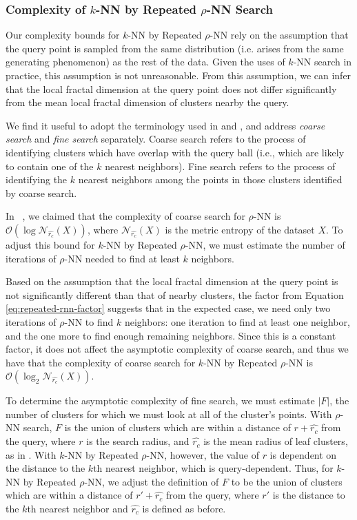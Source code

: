 \subsubsection{Complexity of \texorpdfstring{$k$}{k}-NN by Repeated \texorpdfstring{$\rho$}{p}-NN Search}
\label{subsubsec:methods:repeated-rnn-complexity}

Our complexity bounds for $k$-NN by Repeated $\rho$-NN rely on the assumption that the query point is sampled from the same distribution (i.e. arises from the same generating phenomenon) as the rest of the data.
Given the uses of $k$-NN search in practice, this assumption is not unreasonable.
From this assumption, we can infer that the local fractal dimension at the query point does not differ significantly from the mean local fractal dimension of clusters nearby the query.

We find it useful to adopt the terminology used in \cite{ishaq2019clustered} and \cite{yu2015entropy}, and address \emph{coarse search} and \emph{fine search} separately.
Coarse search refers to the process of identifying clusters which have overlap with the query ball (i.e., which are likely to contain one of the $k$ nearest neighbors). 
Fine search refers to the process of identifying the $k$ nearest neighbors among the points in those clusters identified by coarse search.

In ~\cite{ishaq2019clustered}, we claimed that the complexity of coarse search for $\rho$-NN is $\mathcal{O}(\log\mathcal{N}_{\hat{r_c}}(X))$, 
where $\mathcal{N}_{\hat{r_c}}(X)$ is the metric entropy of the dataset $X$. 
To adjust this bound for $k$-NN by Repeated $\rho$-NN, we must estimate the number of iterations of $\rho$-NN needed to find at least $k$ neighbors.

Based on the assumption that the local fractal dimension at the query point is not significantly different than that of nearby clusters, the factor from Equation \ref{eq:repeated-rnn-factor} suggests that in the expected case, we need only two iterations of $\rho$-NN to find $k$ neighbors:
one iteration to find at least one neighbor, and the one more to find enough remaining neighbors.
Since this is a constant factor, it does not affect the asymptotic complexity of coarse search, and thus we have that the complexity of coarse search for $k$-NN by Repeated $\rho$-NN is $\mathcal{O}(\log_2\mathcal{N}_{\hat{r_c}}(X))$.

To determine the asymptotic complexity of fine search, we must estimate $|F|$, the number of clusters for which we must look at all of the cluster's points.
With $\rho$-NN search, $F$ is the union of clusters which are within a distance of $r + \hat{r_c}$ from the query, where $r$ is the search radius, and $\hat{r_c}$ is the mean radius of leaf clusters, as in \cite{yu2015entropy}.
With $k$-NN by Repeated $\rho$-NN, however, the value of $r$ is dependent on the distance to the $k$th nearest neighbor, which is query-dependent.
Thus, for $k$-NN by Repeated $\rho$-NN, we adjust the definition of $F$ to be the union of clusters which are within a distance of $r' + \hat{r_c}$ from the query, where $r'$ is the distance to the $k$th nearest neighbor and $\hat{r_c}$ is defined as before.

